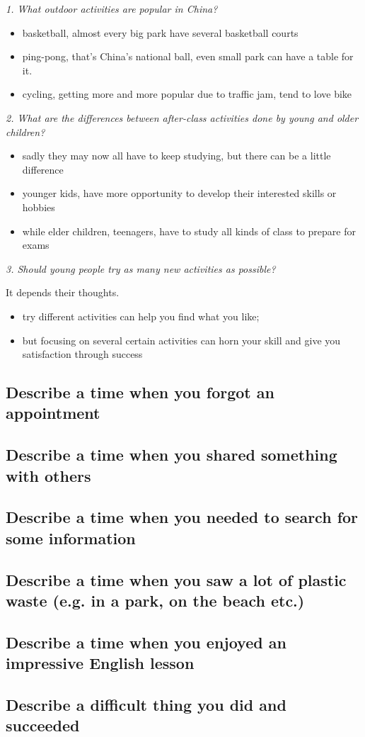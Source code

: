 \documentclass[conference]{IEEEtran}
\begin{document}
\textit{1. What outdoor activities are popular in China?}
\begin{itemize}
    \item basketball, almost every big park have several basketball courts
    \item ping-pong, that's China's national ball, even small park can have a table for it.
    \item cycling, getting more and more popular due to traffic jam, tend to love bike
\end{itemize}

\textit{2. What are the differences between after-class activities done by young and older children?}
\begin{itemize}
    \item sadly they may now all have to keep studying, but there can be a little difference
    \item younger kids, have more opportunity to develop their interested skills or hobbies
    \item while elder children, teenagers, have to study all kinds of class to prepare for exams
\end{itemize}

\textit{3. Should young people try as many new activities as possible?}

It depends their thoughts.
\begin{itemize}
    \item try different activities can help you find what you like;
    \item but focusing on several certain activities can horn your skill and give you satisfaction through success
\end{itemize}

\subsection{Describe a time when you forgot an appointment}
\subsection{Describe a time when you shared something with others}
\subsection{Describe a time when you needed to search for some information}
\subsection{Describe a time when you saw a lot of plastic waste (e.g. in a park, on the beach
etc.)}
\subsection{Describe a time when you enjoyed an impressive English lesson}
\subsection{Describe a difficult thing you did and succeeded}
\end{document}
